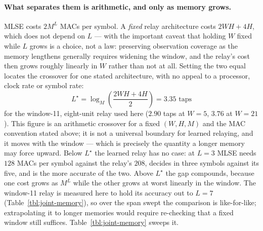\paragraph{What separates them is arithmetic, and only as memory grows.} MLSE costs $2M^{L}$ MACs per symbol. A \emph{fixed} relay architecture costs $2WH + 4H$, which does not depend on $L$ --- with the important caveat that holding $W$ fixed while $L$ grows is a choice, not a law: preserving observation coverage as the memory lengthens generally requires widening the window, and the relay's cost then grows roughly linearly in $W$ rather than not at all. Setting the two equal locates the crossover for one stated architecture, with no appeal to a processor, clock rate or symbol rate:
\begin{equation}
L^{\star} = \log_{M}\!\left(\frac{2WH + 4H}{2}\right) = 3.35 \text{ taps}
\label{eq:mac-crossover}
\end{equation}
for the window-11, eight-unit relay used here ($2.90$ taps at $W=5$, $3.76$ at $W=21$). This figure is an arithmetic crossover for a fixed $(W,H,M)$ and the MAC convention stated above; it is not a universal boundary for learned relaying, and it moves with the window --- which is precisely the quantity a longer memory may force upward. Below $L^{\star}$ the learned relay has no case: at $L=3$ MLSE needs $128$ MACs per symbol against the relay's $208$, decides in three symbols against its five, and is the more accurate of the two. Above $L^{\star}$ the gap compounds, because one cost grows as $M^{L}$ while the other grows at worst linearly in the window. The window-11 relay is measured here to hold its accuracy out to $L=7$ (Table~\ref{tbl:joint-memory}), so over the span swept the comparison is like-for-like; extrapolating it to longer memories would require re-checking that a fixed window still suffices. Table~\ref{tbl:joint-memory} sweeps it.

